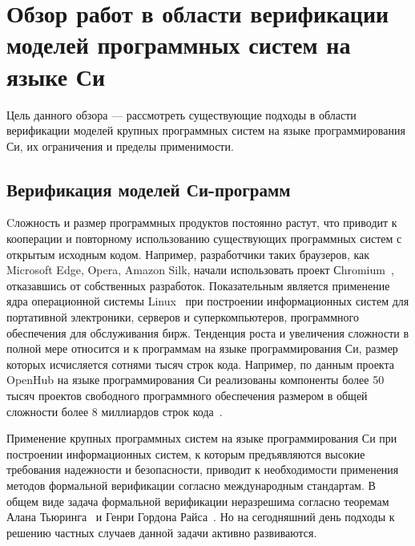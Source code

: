 \chapter{Обзор работ в области верификации моделей программных систем на языке Си}
Цель данного обзора --- рассмотреть существующие подходы в области верификации моделей крупных программных систем на языке программирования Си, их ограничения и  пределы применимости.

\section{Верификация моделей Си-программ}

Cложность и размер программных продуктов постоянно растут, что приводит к кооперации и повторному использованию существующих программных систем с открытым исходным кодом.
Например, разработчики таких браузеров, как Microsoft Edge, Opera, Amazon Silk, начали использовать проект Сhromium~\cite{chromium}, отказавшись от собственных разработок.
Показательным является применение ядра операционной системы Linux~\cite{linux} при построении информационных систем для портативной электроники, серверов и суперкомпьютеров, программного обеспечения для обслуживания бирж.
Тенденция роста и увеличения сложности в полной мере относится и к программам на языке программирования Си, размер которых исчисляется сотнями тысяч строк кода.
Например, по данным проекта OpenHub на языке программирования Си реализованы компоненты более 50 тысяч проектов свободного программного обеспечения размером в общей сложности более 8 миллиардов строк кода~\cite{openhub}.

Применение крупных программных систем на языке программирования Си при построении информационных систем, к которым предъявляются высокие требования надежности и безопасности, приводит к необходимости применения методов формальной верификации согласно международным стандартам.
В общем виде задача формальной верификации неразрешима согласно теоремам Алана Тьюринга~\cite{turing} и Генри Гордона Райса~\cite{rice}. 
Но на сегодняшний день подходы к решению частных случаев данной задачи активно развиваются.

